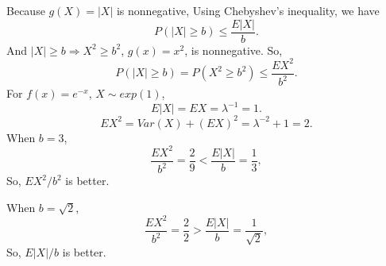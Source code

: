 \documentclass[14pt]{elegantbook}
\begin{document}
    \begin{solution}
        Because $g(X)=|X|$ is nonnegative, Using Chebyshev's inequality, we have
        \[P(|X|\geq b)\leq\frac{E|X|}{b}. \]
        And $|X|\geq b\Rightarrow X^2\geq b^2$, $g(x)=x^2$, is nonnegative. So, 
        \[P(|X|\geq b)=P(X^2\geq b^2)\leq\frac{EX^2}{b^2}. \]
        For $f(x)=e^{-x}$, $X\sim exp(1)$, 
        \[E|X|=EX=\lambda^{-1}=1. \]
        \[EX^2=Var(X)+(EX)^2=\lambda^{-2}+1=2. \]
        When $b=3$, 
        \[
            \frac{EX^2}{b^2}=\frac{2}{9}<\frac{E|X|}{b}=\frac{1}{3},
        \]
        So, $EX^2/b^2$ is better. 

        When $b=\sqrt{2}$, 
        \[
            \frac{EX^2}{b^2}=\frac{2}{2}>\frac{E|X|}{b}=\frac{1}{\sqrt{2}},
        \]
        So, $E|X|/b$ is better. 
    \end{solution}
    
\end{document}
